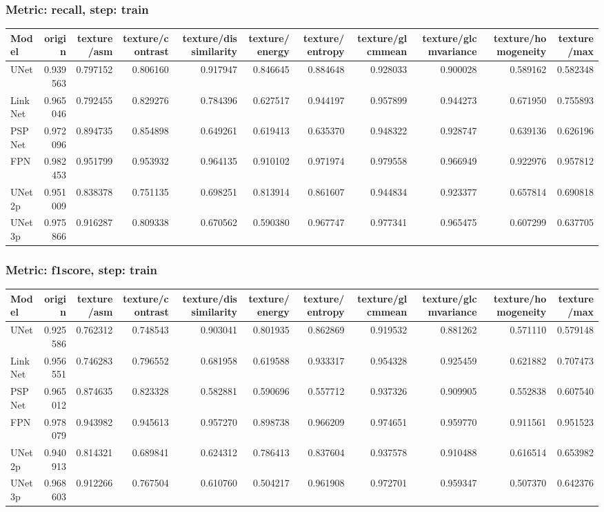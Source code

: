 \documentclass{article}
\begin{document}
\subsubsection{Metric: recall, step: train}
\begin{tabular}{lrrrrrrrrrr}
\toprule
Model & origin & texture/asm & texture/contrast & texture/dissimilarity & texture/energy & texture/entropy & texture/glcmmean & texture/glcmvariance & texture/homogeneity & texture/max \\
\midrule
UNet & 0.939563 & 0.797152 & 0.806160 & 0.917947 & 0.846645 & 0.884648 & 0.928033 & 0.900028 & 0.589162 & 0.582348 \\
LinkNet & 0.965046 & 0.792455 & 0.829276 & 0.784396 & 0.627517 & 0.944197 & 0.957899 & 0.944273 & 0.671950 & 0.755893 \\
PSPNet & 0.972096 & 0.894735 & 0.854898 & 0.649261 & 0.619413 & 0.635370 & 0.948322 & 0.928747 & 0.639136 & 0.626196 \\
FPN & 0.982453 & 0.951799 & 0.953932 & 0.964135 & 0.910102 & 0.971974 & 0.979558 & 0.966949 & 0.922976 & 0.957812 \\
UNet2p & 0.951009 & 0.838378 & 0.751135 & 0.698251 & 0.813914 & 0.861607 & 0.944834 & 0.923377 & 0.657814 & 0.690818 \\
UNet3p & 0.975866 & 0.916287 & 0.809338 & 0.670562 & 0.590380 & 0.967747 & 0.977341 & 0.965475 & 0.607299 & 0.637705 \\
\bottomrule
\end{tabular}

\subsubsection{Metric: f1score, step: train}
\begin{tabular}{lrrrrrrrrrr}
\toprule
Model & origin & texture/asm & texture/contrast & texture/dissimilarity & texture/energy & texture/entropy & texture/glcmmean & texture/glcmvariance & texture/homogeneity & texture/max \\
\midrule
UNet & 0.925586 & 0.762312 & 0.748543 & 0.903041 & 0.801935 & 0.862869 & 0.919532 & 0.881262 & 0.571110 & 0.579148 \\
LinkNet & 0.956551 & 0.746283 & 0.796552 & 0.681958 & 0.619588 & 0.933317 & 0.954328 & 0.925459 & 0.621882 & 0.707473 \\
PSPNet & 0.965012 & 0.874635 & 0.823328 & 0.582881 & 0.590696 & 0.557712 & 0.937326 & 0.909905 & 0.552838 & 0.607540 \\
FPN & 0.978079 & 0.943982 & 0.945613 & 0.957270 & 0.898738 & 0.966209 & 0.974651 & 0.959770 & 0.911561 & 0.951523 \\
UNet2p & 0.940913 & 0.814321 & 0.689841 & 0.624312 & 0.786413 & 0.837604 & 0.937578 & 0.910488 & 0.616514 & 0.653982 \\
UNet3p & 0.968603 & 0.912266 & 0.767504 & 0.610760 & 0.504217 & 0.961908 & 0.972701 & 0.959347 & 0.507370 & 0.642376 \\
\bottomrule
\end{tabular}
\end{document}
